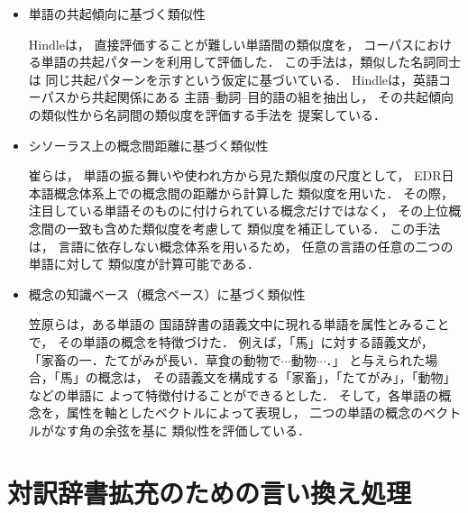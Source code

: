 \begin{itemize}
 \item 単語の共起傾向に基づく類似性

       Hindle\cite{hindle}は，
       直接評価することが難しい単語間の類似度を，
       コーパスにおける単語の共起パターンを利用して評価した．
       この手法は，類似した名詞同士は
       同じ共起パターンを示すという仮定に基づいている．
       Hindleは，英語コーパスから共起関係にある
       主語--動詞--目的語の組を抽出し，
       その共起傾向の類似性から名詞間の類似度を評価する手法を
       提案している．
	   
	   
 \item シソーラス上の概念間距離に基づく類似性

       崔\cite{cui}らは，
       単語の振る舞いや使われ方から見た類似度の尺度として，
       EDR日本語概念体系上での概念間の距離から計算した
       類似度を用いた．
       その際，
       注目している単語そのものに付けられている概念だけではなく，
       その上位概念間の一致も含めた類似度を考慮して
       類似度を補正している．
       この手法は，
       言語に依存しない概念体系を用いるため，
       任意の言語の任意の二つの単語に対して
       類似度が計算可能である．

 \item 概念の知識ベース（概念ベース）に基づく類似性

       笠原ら\cite{kasahara}は，ある単語の
       国語辞書の語義文中に現れる単語を属性とみることで，
       その単語の概念を特徴づけた．
	   例えば，「馬」に対する語義文が，
	   「家畜の一．たてがみが長い．草食の動物で$\cdots$動物$\cdots$．」
	   と与えられた場合，「馬」の概念は，
	   その語義文を構成する「家畜」，「たてがみ」，「動物」などの単語に
       よって特徴付けることができるとした．
       そして，各単語の概念を，属性を軸としたベクトルによって表現し，
       二つの単語の概念のベクトルがなす角の余弦を基に
       類似性を評価している．

\end{itemize}

\section{対訳辞書拡充のための言い換え処理}

